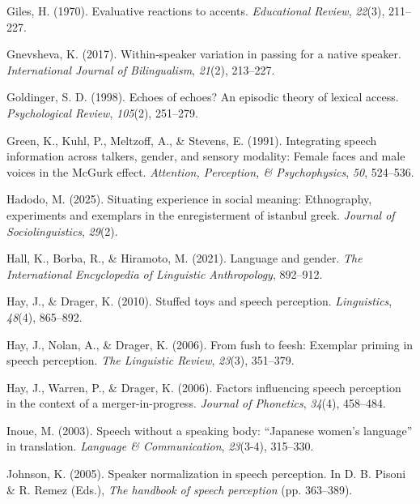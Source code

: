 \documentclass[
  letterpaper,
  DIV=11,
  numbers=noendperiod]{scrartcl}
\newlength{\cslhangindent}
\newenvironment{CSLReferences}[2] %
 {\begin{list}{}{%
  \setlength{\itemindent}{0pt}
  \setlength{\leftmargin}{0pt}
  \setlength{\parsep}{0pt}
  \ifodd #1
   \setlength{\leftmargin}{\cslhangindent}
   \setlength{\itemindent}{-1\cslhangindent}
  \fi
  \setlength{\itemsep}{#2\baselineskip}}}
 {\end{list}}
\begin{document}
\begin{CSLReferences}{1}{0}
Giles, H. (1970). Evaluative reactions to accents. \emph{Educational
Review}, \emph{22}(3), 211--227.

Gnevsheva, K. (2017). Within-speaker variation in passing for a native
speaker. \emph{International Journal of Bilingualism}, \emph{21}(2),
213--227.

Goldinger, S. D. (1998). Echoes of echoes? An episodic theory of lexical
access. \emph{Psychological Review}, \emph{105}(2), 251--279.

Green, K., Kuhl, P., Meltzoff, A., \& Stevens, E. (1991). Integrating
speech information across talkers, gender, and sensory modality: Female
faces and male voices in the McGurk effect. \emph{Attention, Perception,
\& Psychophysics}, \emph{50}, 524--536.

Hadodo, M. (2025). Situating experience in social meaning: Ethnography,
experiments and exemplars in the enregisterment of istanbul greek.
\emph{Journal of Sociolinguistics}, \emph{29}(2).

Hall, K., Borba, R., \& Hiramoto, M. (2021). Language and gender.
\emph{The International Encyclopedia of Linguistic Anthropology},
892--912.

Hay, J., \& Drager, K. (2010). Stuffed toys and speech perception.
\emph{Linguistics}, \emph{48}(4), 865--892.

Hay, J., Nolan, A., \& Drager, K. (2006). From fush to feesh: Exemplar
priming in speech perception. \emph{The Linguistic Review},
\emph{23}(3), 351--379.

Hay, J., Warren, P., \& Drager, K. (2006). Factors influencing speech
perception in the context of a merger-in-progress. \emph{Journal of
Phonetics}, \emph{34}(4), 458--484.

Inoue, M. (2003). Speech without a speaking body: {``Japanese women's
language''} in translation. \emph{Language \& Communication},
\emph{23}(3-4), 315--330.

Johnson, K. (2005). Speaker normalization in speech perception. In D. B.
Pisoni \& R. Remez (Eds.), \emph{The handbook of speech perception} (pp.
363--389).


\end{CSLReferences}
\end{document}
